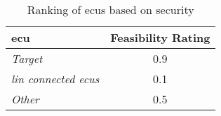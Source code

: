 \begin{table}[h]
    \label{table:ecu_rating}
    \centering
    \begin{tabular}{|l|c|}
    \hline
    \textbf{\acrshort{ecu}} & \textbf{Feasibility Rating} \\
    \hline
    \textit{Target} & 0.9 \\
    \textit{\acrshort{lin} connected \acrshort{ecu}s} & 0.1 \\
    \textit{Other} & 0.5 \\
    \hline
    \end{tabular}
    \caption{Ranking of \acrshort{ecu}s based on security}
\end{table}